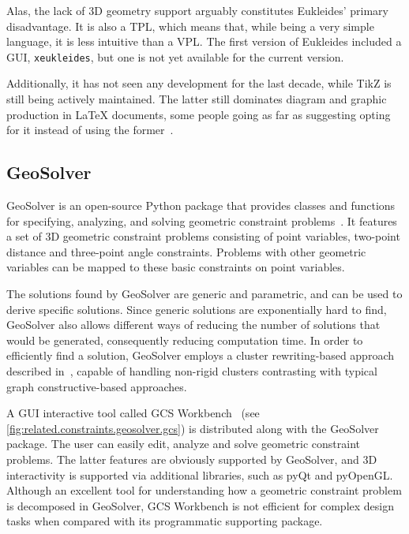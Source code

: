 Alas, the lack of 3D geometry support arguably constitutes Eukleides' primary
disadvantage.  It is also a \ac{TPL}, which means that, while being a very
simple language, it is less intuitive than a \ac{VPL}.  The first version of
Eukleides included a \ac{GUI}, \texttt{xeukleides}, but one is not yet available
for the current version.

Additionally, it has not seen any development for the last decade, while
\acs{TikZ} is still being actively maintained.  The latter still dominates
diagram and graphic production in \LaTeX{} documents, some people going as far
as suggesting opting for it instead of using the
former~\cite{Christian:2014:TEXE:Eukleides}.

\subsection{GeoSolver}%
\label{sec:related.constraints.geosolver}

GeoSolver is an open-source Python package that provides classes and functions
for specifying, analyzing, and solving geometric constraint
problems~\cite{Van:2009:GeoSolver}.  It features a set of 3D geometric
constraint problems consisting of point variables, two-point distance and
three-point angle constraints.  Problems with other geometric variables can be
mapped to these basic constraints on point variables.

The solutions found by GeoSolver are generic and parametric, and can be used to
derive specific solutions.  Since generic solutions are exponentially hard to
find, GeoSolver also allows different ways of  reducing the number of solutions
that would be generated, consequently reducing computation time.  In order to
efficiently find a solution, GeoSolver employs a cluster rewriting-based
approach described in~\cite{Van:2009:NRCRASSGC}, capable of handling non-rigid
clusters contrasting with typical graph constructive-based approaches.

A \ac{GUI} interactive tool called \ac{GCS} Workbench~\cite{DeRegt:2008:WGCS}
(see \cref{fig:related.constraints.geosolver.gcs}) is distributed along with the
GeoSolver package.  The user can easily edit, analyze and solve geometric
constraint problems.  The latter features are obviously supported by GeoSolver,
and 3D interactivity is supported via additional libraries, such as pyQt and
pyOpenGL\@.  Although an excellent tool for understanding how a geometric
constraint problem is decomposed in GeoSolver, \ac{GCS} Workbench is not
efficient for complex design tasks when compared with its programmatic
supporting package.

